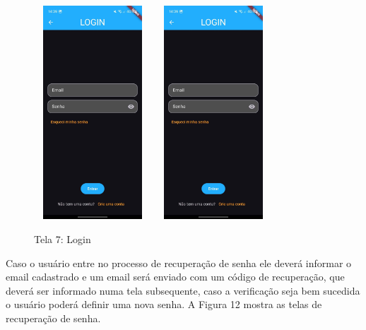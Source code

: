     \begin{figure}[h]
        \centering
        \includegraphics[width=44mm,height=80mm]{imagens/login.jpg}
        \hspace{10mm}
        \includegraphics[width=44mm,height=80mm]{imagens/login.jpg} %
        \caption{\scriptsize Tela 7: Login}
        \footnotesize  {}
        \label{fig:tela7}
    \end{figure}

    \FloatBarrier
    
    Caso o usuário entre no processo de recuperação de senha ele deverá informar o email cadastrado e um email será enviado com um código de recuperação, que deverá ser informado numa tela subsequente, caso a verificação seja bem sucedida o usuário poderá definir uma nova senha. A Figura 12 mostra as telas de recuperação de senha.
    
    \FloatBarrier

